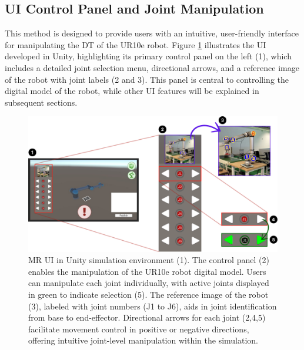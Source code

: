 \subsection{UI Control Panel and Joint Manipulation}
\label{subsection:ui-control-method}
This method is designed to provide users with an intuitive, user-friendly interface for manipulating the \ac{DT} of the UR10e robot. Figure \ref{f:ui-control} illustrates the \ac{UI} developed in Unity, highlighting its primary control panel on the left (1), which includes a detailed joint selection menu, directional arrows, and a reference image of the robot with joint labels (2 and 3). This panel is central to controlling the digital model of the robot, while other \ac{UI} features will be explained in subsequent sections.

\begin{figure}[h]
    \centering
    \includegraphics[width=\textwidth]{figs/interface-numerada-2.png}
    \caption{\ac{MR} \ac{UI} in Unity simulation environment (1). The control panel (2) enables the manipulation of the UR10e robot digital model. Users can manipulate each joint individually, with active joints displayed in green to indicate selection (5). The reference image of the robot (3), labeled with joint numbers (J1 to J6), aids in joint identification from base to end-effector. Directional arrows for each joint (2,4,5) facilitate movement control in positive or negative directions, offering intuitive joint-level manipulation within the simulation.}
    \label{f:ui-control}
\end{figure}



